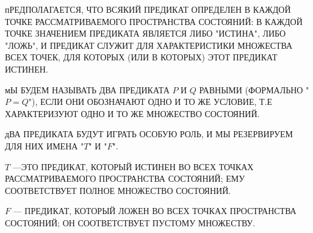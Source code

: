 пРЕДПОЛАГАЕТСЯ, ЧТО ВСЯКИЙ ПРЕДИКАТ ОПРЕДЕЛЕН В
КАЖДОЙ ТОЧКЕ РАССМАТРИВАЕМОГО ПРОСТРАНСТВА
СОСТОЯНИЙ: В КАЖДОЙ ТОЧКЕ ЗНАЧЕНИЕМ ПРЕДИКАТА
ЯВЛЯЕТСЯ ЛИБО "ИСТИНА", ЛИБО "ЛОЖЬ", И ПРЕДИКАТ
СЛУЖИТ ДЛЯ ХАРАКТЕРИСТИКИ МНОЖЕСТВА ВСЕХ ТОЧЕК,
ДЛЯ КОТОРЫХ (ИЛИ В КОТОРЫХ) ЭТОТ ПРЕДИКАТ
ИСТИНЕН.

мЫ БУДЕМ НАЗЫВАТЬ ДВА ПРЕДИКАТА $P$ И $Q$ РАВНЫМИ
(ФОРМАЛЬНО "$P=Q$"), ЕСЛИ ОНИ ОБОЗНАЧАЮТ ОДНО И
ТО ЖЕ УСЛОВИЕ, Т.Е ХАРАКТЕРИЗУЮТ ОДНО И ТО ЖЕ
МНОЖЕСТВО СОСТОЯНИЙ.

дВА ПРЕДИКАТА БУДУТ ИГРАТЬ ОСОБУЮ РОЛЬ, И МЫ
РЕЗЕРВИРУЕМ ДЛЯ НИХ ИМЕНА "$T$" И "$F$".

$T$ ---ЭТО ПРЕДИКАТ, КОТОРЫЙ ИСТИНЕН ВО ВСЕХ
ТОЧКАХ РАССМАТРИВАЕМОГО ПРОСТРАНСТВА СОСТОЯНИЙ;
ЕМУ СООТВЕТСТВУЕТ ПОЛНОЕ МНОЖЕСТВО СОСТОЯНИЙ.

$F$ --- ПРЕДИКАТ, КОТОРЫЙ ЛОЖЕН ВО ВСЕХ ТОЧКАХ
ПРОСТРАНСТВА СОСТОЯНИЙ; ОН СООТВЕТСТВУЕТ ПУСТОМУ
МНОЖЕСТВУ.

\bye
